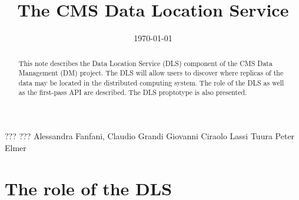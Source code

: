 \documentclass[pdftex]{cmspaper}
\begin{document}

\begin{titlepage}

   \date{\today}

  \title{The CMS Data Location Service}


  \begin{Authlist}
    ??? ???
    Alessandra Fanfani, Claudio Grandi
    Giovanni Ciraolo
    Lassi Tuura
    Peter Elmer

  \end{Authlist}


  \begin{abstract}

    This note describes the Data Location Service (DLS) component
    of the CMS Data Management (DM) project. 
    The DLS will allow users to discover where replicas of the 
    data may be located in the distributed computing system.
    The role of the DLS as well as the first-pass API are described.
    The DLS proptotype is also presented.
\end{abstract} 

  
\end{titlepage}

\setcounter{page}{2}%
\tableofcontents

\section{The role of the DLS}
\label{sec:intro}

\end{document}

